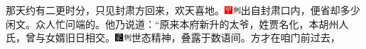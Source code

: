 那天约有二更时分，只见封肃方回来，欢天喜地。{\includegraphics[width=3mm]{../Images/00002}\includegraphics[width=3mm]{../Images/00011}\footnotesize \kaishu 出自封肃口内，便省却多少闲文。}众人忙问端的。他乃说道：``原来本府新升的太爷，姓贾名化，本胡州人氏，曾与女婿旧日相交。{\includegraphics[width=3mm]{../Images/00006}\includegraphics[width=3mm]{../Images/00011}\footnotesize \kaishu 世态精神，叠露于数语间。}方才在咱门前过去，